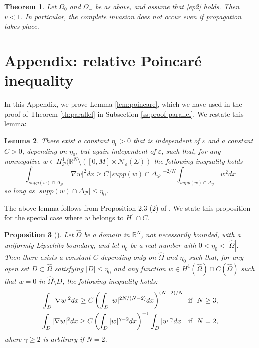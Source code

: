 \documentclass[a4paper,12pt,fullpage]{article}
\numberwithin{equation}{section}
\newtheorem{Lemma}{Lemma}[section]
\newtheorem{Th}[Lemma]{Theorem}
\newtheorem{Prop}[Lemma]{Proposition}
\def\R{{\mathbb R}}
\def\ep{\varepsilon}
\begin{document}
\begin{Th}\label{th:incomplete2}
Let $\Omega_0$ and $\Omega_{-}$ be as above, and assume that \eqref{ep2} holds. Then $\bar{v}<1$. In particular, the complete invasion does not occur even if propagation takes place.
\end{Th}


\appendix

\section{Appendix: relative Poincar\'e inequality}
\label{s:poincare}

In this Appendix, we prove Lemma \ref{lem:poincare}, which we have used in the proof of Theorem \ref{th:parallel} in Subsection \ref{ss:proof-parallel}.  We restate this lemma:

\begin{Lemma}\label{lem:poincare-a}
There exist a constant $\eta_0>0$ that is independent of $\ep$ and a constant $C>0$, depending on $\eta_0$, but again independent of $\ep$, such that, for any nonnegative $w\in H^1_{\mathcal P}(\R^N\setminus \left( [0,M]\times {\mathcal N}_\ep(\Sigma)\right)$ the following inequality holds
\begin{equation}\label{poincare-a}
\int_{supp(w)\cap\Delta_{\mathcal P}}|\nabla w|^2 dx \geq C\, |supp(w)\cap\Delta_{\mathcal P}|^{-2/N} \int_{supp(w)\cap\Delta_{\mathcal P}}w^2 dx
\end{equation}
so long as $|supp(w)\cap\Delta_{\mathcal P}|\leq \eta_0$.
\end{Lemma}

The above lemma follows from Proposition 2.3 (2) of \cite{BV}. We state this proposition for the special case where $w$ belongs to $H^1\cap C$. 

\begin{Prop}[\cite{BV}]\label{prop:poincare}
Let $\widehat\Omega$ be a domain in $\R^N$, not necessarily bounded, with a uniformly Lipschitz boundary, and let $\eta_0$ be a real number with $0<\eta_0<|\widehat\Omega|$. Then there exists a constant $C$ depending only on $\widehat\Omega$ and $\eta_0$ such that, for any open set $D\subset\widehat\Omega$ satisfying $|D|\leq\eta_0$ and any function $w\in H^1(\widehat\Omega)\cap C(\widehat\Omega)$ such that $w=0$ in $\widehat\Omega\setminus D$, the following inequality holds:
\begin{equation}\label{sobolev-general}
\begin{split}
\int_{D}|\nabla w|^2 dx \geq C\left(\int_{D} |w|^{2N/(N-2)} dx\right)^{(N-2)/N} \ \ & \hbox{if}\ \ N\geq 3,\\
\int_{D}|\nabla w|^2 dx \geq C \left(\int_{D}|w|^{\gamma-2}dx\right)^{-1}\int_{D}|w|^\gamma dx\ \ \ & \hbox{if}\ \ N=2,
\end{split}
\end{equation}
where $\gamma\ge2$ is arbitrary if $N=2$.
\end{Prop}
\end{document}
